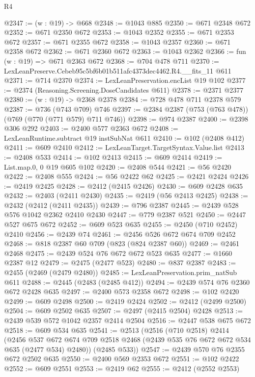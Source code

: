 \begin{lexlean}{R4}
\begin{coremodule}
@2347 := (w : @19) -> @668
@2348 := @1043 @885
@2350 := @671 @2348 @672
@2352 := @671 @2350 @672
@2353 := @1043 @2352
@2355 := @671 @2353 @672
@2357 := @671 @2355 @672
@2358 := @1043 @2357
@2360 := @671 @2358 @672
@2362 := @671 @2360 @672
@2363 := @1043 @2362
@2366 := fun (w : @19) => @671 @2363 @672
@2368 := @704 @478 @711
@2370 := LexLeanPreserve.Cebeb95c5bf6b01b511afc4373dec4462.R4.__fits_11 @611
@2371 := @714 @2370
@2374 := LexLeanPreservation.encList @19 @102
@2377 := @2374 (Reasoning.Screening.DoseCandidates @611)
@2378 := @2371 @2377
@2380 := (w : @19) -> @2368 @2378
@2384 := @728 @478 @711 @2378 @579
@2387 := @736 (@743 @709) @746
@2397 := @2384 @2387 (@753 (@763 @478)) (@769 (@770 (@771 @579) @711 @746))
@2398 := @974 @2387
@2400 := @2398 @306 @292
@2403 := @2400 @577 @2363 @672
@2408 := LexLeanRuntime.subtract @19 instSubNat @611
@2410 := @102 (@2408 @412)
@2411 := @609 @2410
@2412 := LexLeanTarget.TargetSyntax.Value.list
@2413 := @2408 @533
@2414 := @102 @2413
@2415 := @609 @2414
@2419 := List.map.{0, 0} @19 @605 @102
@2420 := @2408 @544
@2421 := @56 @2420
@2422 := @2408 @555
@2424 := @56 @2422 @62
@2425 := @2421 @2424
@2426 := @2419 @2425
@2428 := @2412 (@2415 @2426)
@2430 := @609 @2428 @635
@2432 := @2403 (@2411 @2430)
@2435 := @2419 (@56 @2413 @2425)
@2438 := @2432 (@2412 (@2411 @2435))
@2439 := @796 @2387
@2445 := @2439 @528 @576 @1042 @2362 @2410 @2430
@2447 := @779 @2387 @521
@2450 := @2447 @527 @675 @672
@2452 := @609 @523 @635
@2455 := @2450 (@710 @2452) @2410
@2456 := @2439 @74
@2461 := @2456 @526 @672 @674 @709 @2452
@2468 := @818 @2387 @60 @709 (@823 (@824 @2387 @60))
@2469 := @2461 @2468
@2475 := @2439 @524 @76 @672 @672 @523 @635
@2477 := @1660 @2387 @12
@2479 := @2475 (@2477 @523)
@2480 := @837 @2387
@2483 := @2455 (@2469 (@2479 @2480))
@2485 := LexLeanPreservation.prim_natSub @611
@2488 := @2445 (@2483 (@2485 @412))
@2494 := @2439 @574 @76 @2360 @672 @2428 @635
@2497 := @2400 @573 @2358 @672
@2498 := @102 @2420
@2499 := @609 @2498
@2500 := @2419 @2424
@2502 := @2412 (@2499 @2500)
@2504 := @609 @2502 @635
@2507 := @2497 (@2415 @2504) @2428
@2513 := @2439 @539 @572 @1042 @2357 @2414 @2504
@2516 := @2447 @538 @675 @672
@2518 := @609 @534 @635
@2541 := @2513
    (@2516
      (@710 @2518)
      @2414
      (@2456
        @537
        @672
        @674
        @709
        @2518
        @2468
        (@2439 @535 @76 @672 @672 @534 @635 (@2477 @534) @2480))
      (@2485 @533))
@2547 := @2439 @570 @76 @2355 @672 @2502 @635
@2550 := @2400 @569 @2353 @672
@2551 := @102 @2422
@2552 := @609 @2551
@2553 := @2419 @62
@2555 := @2412 (@2552 @2553)

\end{coremodule}
\end{lexlean}
